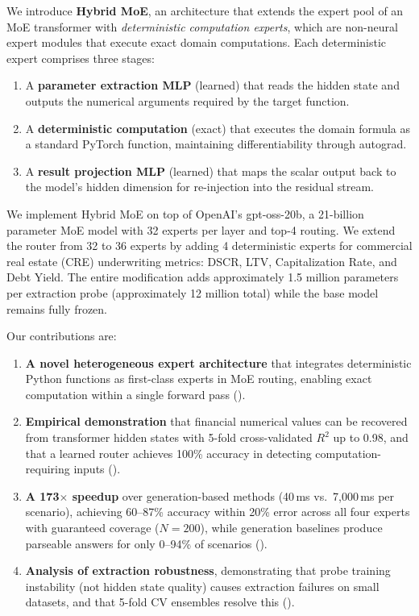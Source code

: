 We introduce \textbf{Hybrid MoE}, an architecture that extends the
expert pool of an MoE transformer with \emph{deterministic computation
experts}, which are non-neural expert modules that execute exact domain
computations. Each deterministic expert comprises three stages:
\begin{enumerate}
\item A \textbf{parameter extraction MLP} (learned) that reads the hidden
state and outputs the numerical arguments required by the target
function.
\item A \textbf{deterministic computation} (exact) that executes the
domain formula as a standard PyTorch function, maintaining
differentiability through autograd.
\item A \textbf{result projection MLP} (learned) that maps the scalar
output back to the model's hidden dimension for re-injection into
the residual stream.
\end{enumerate}

We implement Hybrid MoE on top of OpenAI's gpt-oss-20b, a 21-billion
parameter MoE model with 32 experts per layer and top-4 routing. We
extend the router from 32 to 36 experts by adding 4 deterministic
experts for commercial real estate (CRE) underwriting metrics:
DSCR, LTV, Capitalization Rate, and Debt Yield. The entire modification
adds approximately 1.5 million parameters per extraction probe
(approximately 12 million total) while the base model remains fully
frozen.

Our contributions are:
\begin{enumerate}
\item \textbf{A novel heterogeneous expert architecture} that integrates
deterministic Python functions as first-class experts in MoE
routing, enabling exact computation within a single forward pass
().
\item \textbf{Empirical demonstration} that financial numerical values
can be recovered from transformer hidden states with 5-fold
cross-validated $R^2$ up to 0.98, and that a learned router
achieves 100\% accuracy in detecting computation-requiring inputs
().
\item \textbf{A 173$\times$ speedup} over generation-based methods
(40\,ms vs.\ 7{,}000\,ms per scenario), achieving 60--87\%
accuracy within 20\% error across all four experts with guaranteed
coverage ($N{=}200$), while generation baselines produce parseable
answers for only 0--94\% of scenarios ().
\item \textbf{Analysis of extraction robustness}, demonstrating that
probe training instability (not hidden state quality) causes
extraction failures on small datasets, and that 5-fold CV
ensembles resolve this ().
\end{enumerate}
